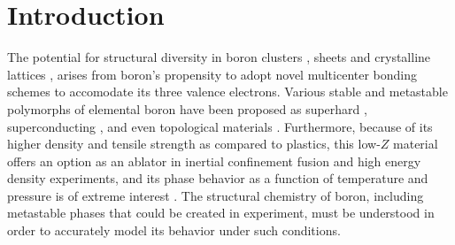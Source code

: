 \documentclass[reprint,aps,prl,twocolumn,letterpaper]{revtex4-2}
\begin{document}
\section{Introduction}
%
The potential for structural diversity in boron clusters \cite{Zhai:2003a,Alexandrova:2006a}, sheets \cite{Li:2019a,Sun:2017a} and crystalline lattices \cite{Albert:2009,Ogitsu:2013,Shirai:2017a}, arises from boron's propensity to adopt novel multicenter bonding schemes to accomodate its three valence electrons. Various stable and metastable polymorphs of elemental boron have been proposed as superhard \cite{Veprek:2011,Simak:2009,Zhou:2010a}, superconducting \cite{Zhang:2020,Eremets:2001,Ma:2004,Li:2014a}, and even topological materials \cite{Gao:2018}. Furthermore, because of its higher density and tensile strength as compared to plastics, this low-$Z$ material offers an option as an ablator in inertial confinement fusion and high energy density experiments, and its phase behavior as a function of temperature and pressure is of extreme interest \cite{PhysRevE.98.023205,ZhangShuai:2020}.  The structural chemistry of boron, including metastable phases that could be created in experiment, must be understood in order to accurately model its behavior under such conditions. 
\end{document}

